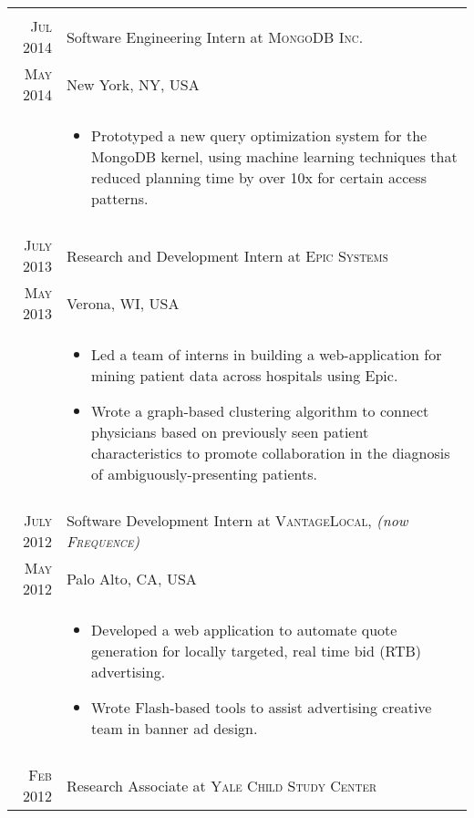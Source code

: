 \documentclass[a4paper,10pt]{article}
\begin{document}
\begin{longtable}{r|p{11cm}}
 \multicolumn{2}{c}{} \\
 \nopagebreak \textsc{Jul 2014} & Software Engineering Intern at \textsc{MongoDB Inc.}\\
 \nopagebreak \textsc{May 2014} & \small{New York, NY, USA} \\
 \nopagebreak	& \footnotesize{
	\begin{itemize}
		\item[]{
			Prototyped a new query optimization system for the MongoDB kernel,
			using machine learning techniques that reduced planning time by over 10x
			for certain access patterns.
		}
	\end{itemize}
   }\\
 \multicolumn{2}{c}{} \\
 \nopagebreak \textsc{July 2013} & Research and Development Intern at \textsc{Epic Systems}\\
 \nopagebreak \textsc{May 2013} & \small{Verona, WI, USA} \\
 \nopagebreak	& \footnotesize{
	\begin{itemize}
		\item[]{
			Led a team of interns in building a web-application for mining patient
			data across hospitals using Epic.
		}
		\item[]{
			Wrote a graph-based clustering algorithm to connect physicians
			based on previously seen patient characteristics to promote
			collaboration in the diagnosis of ambiguously-presenting patients.
		}
	\end{itemize}
   }\\
 \multicolumn{2}{c}{} \\
 \nopagebreak \textsc{July 2012} & Software Development Intern at \textsc{VantageLocal}, \small\emph{(now \textsc{Frequence})}\\
 \nopagebreak \textsc{May 2012} & \small{Palo Alto, CA, USA}\\
 \nopagebreak & \footnotesize{
	\begin{itemize}
		\item[]{
			Developed a web application to automate quote generation for
			locally targeted, real time bid (RTB) advertising.
		}
		\item[]{
			Wrote Flash-based tools to assist advertising creative team
			in banner ad design.
		}
	\end{itemize}
   }\\
 \multicolumn{2}{c}{} \\
 \nopagebreak \textsc{Feb 2012} & Research Associate at \textsc{Yale Child Study Center} \\

\end{longtable}
\end{document}
